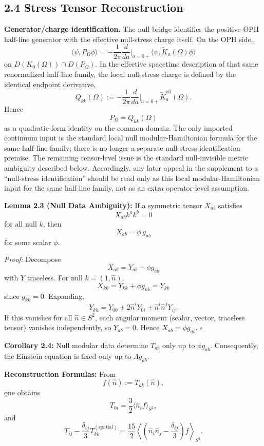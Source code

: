 \subsection{2.4 Stress Tensor Reconstruction}\label{24-stress-tensor-reconstruction}

\textbf{Generator/charge identification.} The null bridge identifies the positive OPH half-line generator with the effective null-stress charge itself. On the OPH side,
\[
\langle\psi,P_\Omega\phi\rangle
=
-\frac{1}{2\pi}\frac{d}{da}\Big|_{a=0+}
\langle\psi,\widetilde K_a(\Omega)\phi\rangle
\]
on \(D(K_0(\Omega))\cap D(P_\Omega)\). In the effective spacetime description of that same renormalized half-line family, the local null-stress charge is defined by the identical endpoint derivative,
\[
Q_{kk}(\Omega)
:=
-\frac{1}{2\pi}\frac{d}{da}\Big|_{a=0+}\widetilde K^{\mathrm{eff}}_a(\Omega).
\]
Hence
\[
P_\Omega = Q_{kk}(\Omega)
\]
as a quadratic-form identity on the common domain. The only imported continuum input is the standard local null modular-Hamiltonian formula for the same half-line family; there is no longer a separate null-stress identification premise. The remaining tensor-level issue is the standard null-invisible metric ambiguity described below. Accordingly, any later appeal in the supplement to a ``null-stress identification'' should be read only as this local modular-Hamiltonian input for the same half-line family, not as an extra operator-level assumption.

\textbf{Lemma 2.3 (Null Data Ambiguity):} If a symmetric tensor \(X_{ab}\) satisfies
\[
X_{ab}k^a k^b = 0
\]
for all null \(k\), then
\[
X_{ab} = \phi\, g_{ab}
\]
for some scalar \(\phi\).

\emph{Proof:} Decompose
\[
X_{ab}=Y_{ab}+\phi g_{ab}
\]
with \(Y\) traceless. For null \(k=(1,\hat n)\),
\[
X_{kk}=Y_{kk}+\phi g_{kk}=Y_{kk}
\]
since \(g_{kk}=0\). Expanding,
\[
Y_{kk}=Y_{00}+2\hat n^iY_{0i}+\hat n^i\hat n^jY_{ij}.
\]
If this vanishes for all \(\hat n\in S^2\), each angular moment (scalar, vector, traceless tensor) vanishes independently, so \(Y_{ab}=0\). Hence \(X_{ab}=\phi g_{ab}\). \(\square\)

\textbf{Corollary 2.4:} Null modular data determine \(T_{ab}\) only up to \(\phi g_{ab}\). Consequently, the Einstein equation is fixed only up to \(\Lambda g_{ab}\).

\textbf{Reconstruction Formulas:} From
\[
f(\hat n):=T_{kk}(\hat n),
\]
one obtains
\[
T_{0i}=\frac{3}{2}\langle \hat n_i f\rangle_{S^2},
\]
and
\[
T_{ij}-\frac{\delta_{ij}}{3}T^{(\mathrm{spatial})}_{kk}
=
\frac{15}{2}
\left\langle
\left(
\hat n_i\hat n_j-\frac{\delta_{ij}}{3}
\right)f
\right\rangle_{S^2}.
\]

